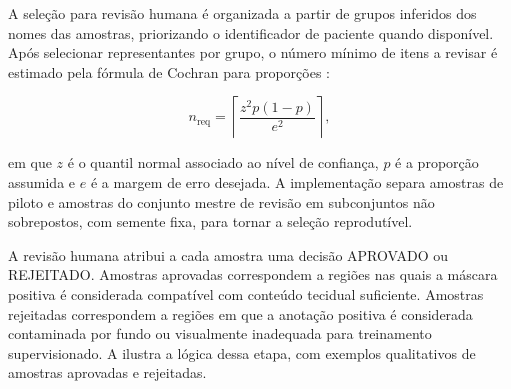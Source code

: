 A seleção para revisão humana é organizada a partir de grupos inferidos dos
nomes das amostras, priorizando o identificador de paciente quando disponível. Após selecionar representantes por grupo, o número mínimo de itens a revisar é
estimado pela fórmula de Cochran para proporções \cite{charan2013sample}:

\begin{equation}
    n_{\mathrm{req}} =
    \left\lceil
    \frac{z^2p(1-p)}{e^2}
    \right\rceil ,
    \label{eq:cochran}
\end{equation}

em que $z$ é o quantil normal associado ao nível de confiança, $p$ é a proporção
assumida e $e$ é a margem de erro desejada. A implementação separa amostras de
piloto e amostras do conjunto mestre de revisão em subconjuntos não sobrepostos,
com semente fixa, para tornar a seleção reprodutível.

A revisão humana atribui a cada amostra uma decisão APROVADO ou
REJEITADO. Amostras aprovadas correspondem a regiões nas quais a máscara
positiva é considerada compatível com conteúdo tecidual suficiente. Amostras
rejeitadas correspondem a regiões em que a anotação positiva é considerada
contaminada por fundo ou visualmente inadequada para treinamento supervisionado.
A  ilustra a lógica dessa etapa, com
exemplos qualitativos de amostras aprovadas e rejeitadas.

